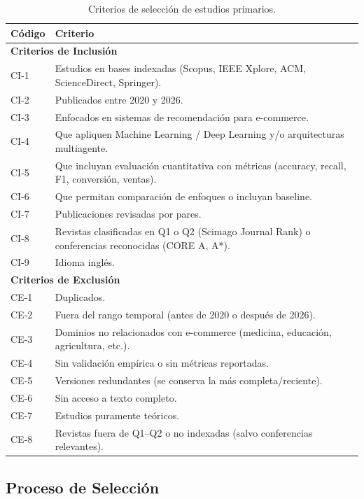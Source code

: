 \documentclass[12pt, a4paper]{article}
\begin{document}
\begin{table}[H]
\centering
\caption{Criterios de selecci\'on de estudios primarios.}
\label{tab:criterios}
\begin{tabularx}{\linewidth}{lX}
\toprule
\textbf{C\'odigo} & \textbf{Criterio} \\
\midrule
\multicolumn{2}{l}{\cellcolor{azulClaro!40}\textbf{Criterios de Inclusi\'on}} \\
CI-1 & Estudios en bases indexadas (Scopus, IEEE Xplore, ACM,
       ScienceDirect, Springer). \\
CI-2 & Publicados entre 2020 y 2026. \\
CI-3 & Enfocados en sistemas de recomendaci\'on para e-commerce. \\
CI-4 & Que apliquen Machine Learning / Deep Learning y/o arquitecturas
       multiagente. \\
CI-5 & Que incluyan evaluaci\'on cuantitativa con m\'etricas (accuracy,
       recall, F1, conversi\'on, ventas). \\
CI-6 & Que permitan comparaci\'on de enfoques o incluyan baseline. \\
CI-7 & Publicaciones revisadas por pares. \\
CI-8 & Revistas clasificadas en Q1 o Q2 (Scimago Journal Rank) o
       conferencias reconocidas (CORE A, A*). \\
CI-9 & Idioma ingl\'es. \\
\midrule
\multicolumn{2}{l}{\cellcolor{rojoAlerta!10}\textbf{Criterios de Exclusi\'on}} \\
CE-1 & Duplicados. \\
CE-2 & Fuera del rango temporal (antes de 2020 o despu\'es de 2026). \\
CE-3 & Dominios no relacionados con e-commerce (medicina, educaci\'on,
       agricultura, etc.). \\
CE-4 & Sin validaci\'on emp\'irica o sin m\'etricas reportadas. \\
CE-5 & Versiones redundantes (se conserva la m\'as completa/reciente). \\
CE-6 & Sin acceso a texto completo. \\
CE-7 & Estudios puramente te\'oricos. \\
CE-8 & Revistas fuera de Q1--Q2 o no indexadas (salvo conferencias
       relevantes). \\
\bottomrule
\end{tabularx}
\end{table}

\subsection{Proceso de Selecci\'on}
\end{document}
